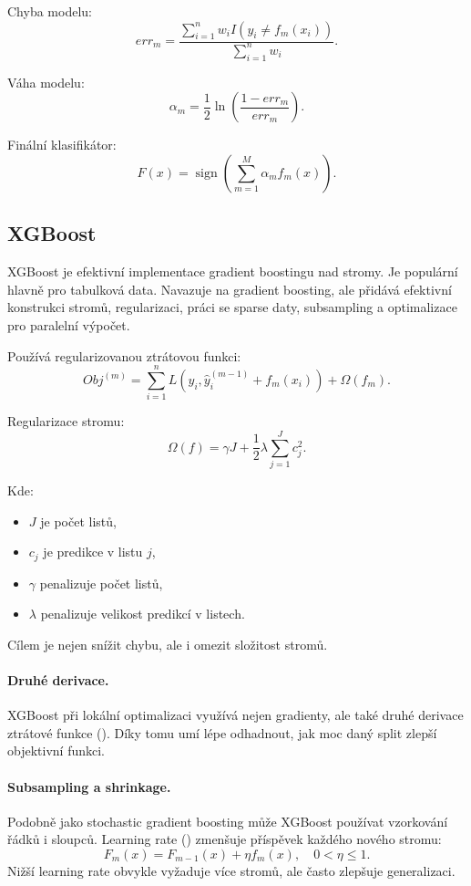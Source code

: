 Chyba modelu:
\[
err_m
=
\frac{
\sum_{i=1}^n w_i I(y_i\neq f_m(x_i))
}{
\sum_{i=1}^n w_i
}.
\]

Váha modelu:
\[
\alpha_m
=
\frac{1}{2}
\ln
\left(
\frac{1-err_m}{err_m}
\right).
\]

Finální klasifikátor:
\[
F(x)
=
\operatorname{sign}
\left(
\sum_{m=1}^M
\alpha_m f_m(x)
\right).
\]

\subsection{XGBoost}

XGBoost je efektivní implementace gradient boostingu nad stromy. Je populární hlavně pro tabulková data.
Navazuje na gradient boosting, ale přidává efektivní konstrukci stromů, regularizaci, práci se sparse daty,
subsampling a optimalizace pro paralelní výpočet.

Používá regularizovanou ztrátovou funkci:
\[
Obj^{(m)}
=
\sum_{i=1}^n
L
\left(
y_i,
\hat{y}^{(m-1)}_i
+
f_m(x_i)
\right)
+
\Omega(f_m).
\]

Regularizace stromu:
\[
\Omega(f)
=
\gamma J
+
\frac{1}{2}
\lambda
\sum_{j=1}^J
c_j^2.
\]

Kde:
\begin{itemize}
    \item $J$ je počet listů,
    \item $c_j$ je predikce v listu $j$,
    \item $\gamma$ penalizuje počet listů,
    \item $\lambda$ penalizuje velikost predikcí v listech.
\end{itemize}

Cílem je nejen snížit chybu, ale i omezit složitost stromů.

\paragraph{Druhé derivace.}
XGBoost při lokální optimalizaci využívá nejen gradienty, ale také druhé derivace ztrátové funkce
(). Díky tomu umí lépe odhadnout, jak moc daný split zlepší objektivní funkci.

\paragraph{Subsampling a shrinkage.}
Podobně jako stochastic gradient boosting může XGBoost používat vzorkování řádků i sloupců. Learning rate
() zmenšuje příspěvek každého nového stromu:
\[
F_m(x)=F_{m-1}(x)+\eta f_m(x),
\quad 0<\eta\leq 1.
\]
Nižší learning rate obvykle vyžaduje více stromů, ale často zlepšuje generalizaci.

